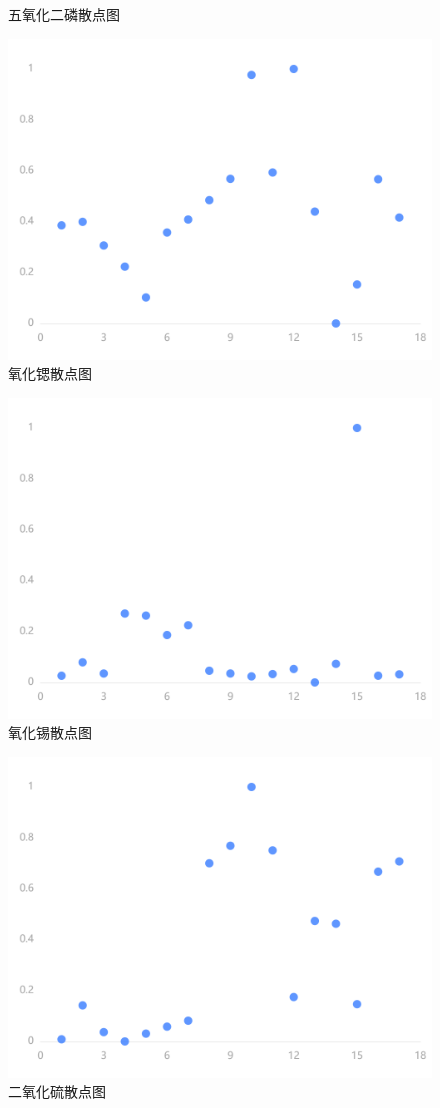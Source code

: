 \documentclass[UTF8]{ctexart}
\begin{document}
\begin{figure}[H]
    \caption{五氧化二磷散点图} %
\end{figure}\begin{figure}[H]\centering
    \includegraphics[width=1\textwidth,height=0.6\textwidth]{img/11.png} %
    \caption{氧化锶散点图} %
\end{figure}\begin{figure}[H]\centering
    \includegraphics[width=1\textwidth,height=0.6\textwidth]{img/12.png} %
    \caption{氧化锡散点图} %
\end{figure}\begin{figure}[H]\centering
    \includegraphics[width=1\textwidth,height=0.6\textwidth]{img/13.png} %
    \caption{二氧化硫散点图} %
\end{figure}
\end{document}
